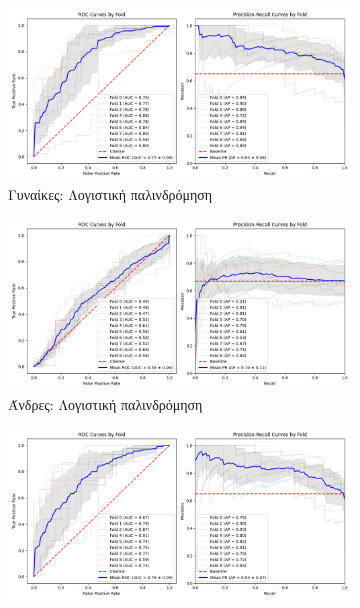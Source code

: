 \documentclass[12pt]{report}
\begin{document}
                \begin{figure}[ht]
                    \centering
                    \begin{subfigure}[b]{0.48\textwidth}
                        \includegraphics[width=\textwidth]{ML/CV/stratified_Female_50-70_LR_useSMOTE_False_k_fold_validation.png}
                        \caption{Γυναίκες: Λογιστική παλινδρόμηση}
                        \label{stratified_Female_50-70_LR_useSMOTE_False_k_fold_validation}
                    \end{subfigure}
                    \hfill
                    \begin{subfigure}[b]{0.48\textwidth}
                        \includegraphics[width=\textwidth]{ML/CV/stratified_Male_50-70_LR_useSMOTE_False_k_fold_validation.png}
                        \caption{Άνδρες: Λογιστική παλινδρόμηση}
                        \label{stratified_Male_50-70_LR_useSMOTE_False_k_fold_validation}
                    \end{subfigure}
                    \vspace{0.5cm}
                    \begin{subfigure}[b]{0.48\textwidth}
                        \includegraphics[width=\textwidth]{ML/CV/stratified_Female_50-70_SVM_useSMOTE_False_k_fold_validation.png}

\end{subfigure}
\end{figure}
\end{document}
